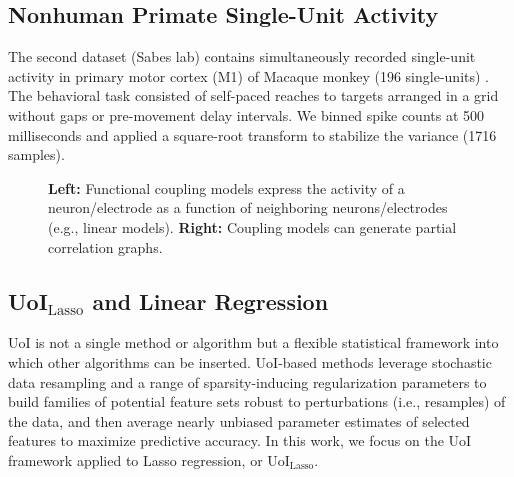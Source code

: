 \documentclass[letterpaper, 10 pt, conference]{ieeeconf}  %
\begin{document}
\subsection{Nonhuman Primate Single-Unit Activity}
The second dataset (Sabes lab) contains simultaneously recorded single-unit activity in primary motor cortex (M1) of Macaque monkey (196 single-units) \cite{nhp}. The behavioral task consisted of self-paced reaches to targets arranged in a grid without gaps or pre-movement delay intervals. We binned spike counts at 500 milliseconds and applied a square-root transform to stabilize the variance (1716 samples).

\begin{figure}[t]
    \centering
    \vspace{-10pt}
    \caption{\textbf{Left:} Functional coupling models express the activity of a neuron/electrode as a function of neighboring neurons/electrodes (e.g., linear models). \textbf{Right:} Coupling models can generate partial correlation graphs.}
    \label{fig:functional_coupling}
    \vspace{-15pt}
\end{figure}

\subsection{ UoI$_{\text{Lasso}}$ and Linear Regression}
UoI is not a single method or algorithm but a flexible statistical framework into which other algorithms can be inserted. UoI-based methods leverage stochastic data resampling and a range of sparsity-inducing regularization parameters to build families of potential feature sets robust to perturbations (i.e., resamples) of the data, and then average nearly unbiased parameter estimates of selected features to maximize predictive accuracy. In this work, we focus on the UoI framework applied to Lasso regression, or UoI$_{\text{Lasso}}$.
\end{document}
